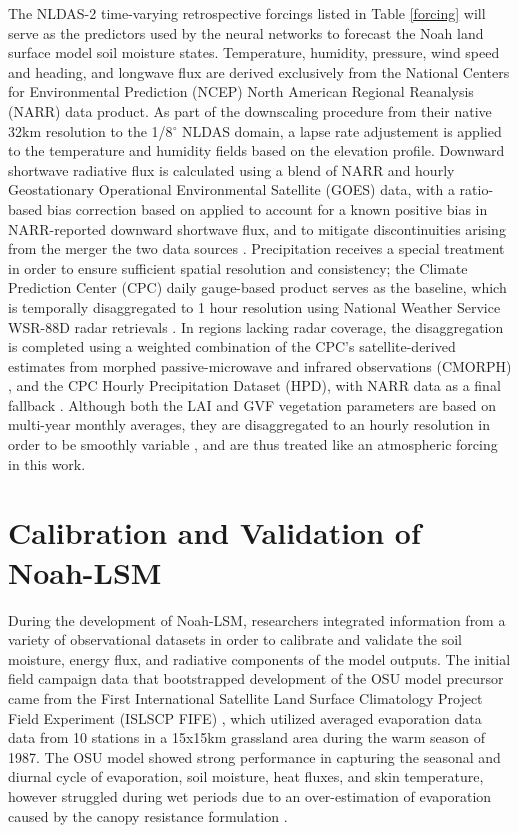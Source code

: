 The NLDAS-2 time-varying retrospective forcings listed in Table \ref{forcing} will serve as the predictors used by the neural networks to forecast the Noah land surface model soil moisture states. Temperature, humidity, pressure, wind speed and heading, and longwave flux are derived exclusively from the National Centers for Environmental Prediction (NCEP) North American Regional Reanalysis (NARR) data product. As part of the downscaling procedure from their native 32km resolution to the 1/8$^\circ$ NLDAS domain, a lapse rate adjustement is applied to the temperature and humidity fields based on the elevation profile. Downward shortwave radiative flux is calculated using a blend of NARR and hourly Geostationary Operational Environmental Satellite (GOES) data, with a ratio-based bias correction based on \parencite{berg_impact_2003} applied to account for a known positive bias in NARR-reported downward shortwave flux, and to mitigate discontinuities arising from the merger the two data sources \parencite{pinker_surface_2003} \parencite{xia_continental-scale_2012-1}. Precipitation receives a special treatment in order to ensure sufficient spatial resolution and consistency; the Climate Prediction Center (CPC) daily gauge-based product \parencite{chen_assessing_2008} serves as the baseline, which is temporally disaggregated to 1 hour resolution using National Weather Service WSR-88D radar retrievals \parencite{fulton_wsr-88d_1998}. In regions lacking radar coverage, the disaggregation is completed using a weighted combination of the CPC's satellite-derived estimates from morphed passive-microwave and infrared observations (CMORPH) \parencite{joyce_cmorph_2004}, and the CPC Hourly Precipitation Dataset (HPD), with NARR data as a final fallback \parencite{baldwin_ncep_1997}.  Although both the LAI and GVF vegetation parameters are based on multi-year monthly averages, they are disaggregated to an hourly resolution in order to be smoothly variable \parencite{wei_improvement_2011}, and are thus treated like an atmospheric forcing in this work.

\section{Calibration and Validation of Noah-LSM}

During the development of Noah-LSM, researchers integrated information from a variety of observational datasets in order to calibrate and validate the soil moisture, energy flux, and radiative components of the model outputs. The initial field campaign data that bootstrapped development of the OSU model precursor came from the First International Satellite Land Surface Climatology Project Field Experiment (ISLSCP FIFE) \parencite{sellers_overview_1992}, which utilized averaged evaporation data data from 10 stations in a 15x15km grassland area during the warm season of 1987. The OSU model showed strong performance in capturing the seasonal and diurnal cycle of evaporation, soil moisture, heat fluxes, and skin temperature, however struggled during wet periods due to an over-estimation of evaporation caused by the canopy resistance formulation \parencite{chen_modeling_1996}.

